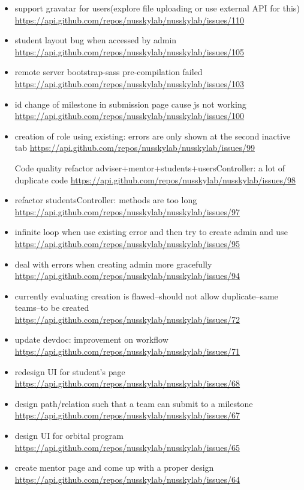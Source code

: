 {\begin{itemize}[noitemsep]
    \item support gravatar for users(explore file uploading or use external API for this) \url{https://api.github.com/repos/nusskylab/nusskylab/issues/110} 
    \item student layout bug when accessed by admin \url{https://api.github.com/repos/nusskylab/nusskylab/issues/105} 
    \item remote server bootstrap-sass pre-compilation failed \url{https://api.github.com/repos/nusskylab/nusskylab/issues/103} 
    \item id change of milestone in submission page cause js not working \url{https://api.github.com/repos/nusskylab/nusskylab/issues/100} 
    \item creation of role using existing: errors are only shown at the second inactive tab \url{https://api.github.com/repos/nusskylab/nusskylab/issues/99} 
    \item [Code quality]refactor adviser+mentor+students+usersController: a lot of duplicate code \url{https://api.github.com/repos/nusskylab/nusskylab/issues/98} 
    \item refactor studentsController: methods are too long \url{https://api.github.com/repos/nusskylab/nusskylab/issues/97} 
    \item infinite loop when use existing error and then try to create admin and use \url{https://api.github.com/repos/nusskylab/nusskylab/issues/95} 
    \item deal with errors when creating admin more gracefully \url{https://api.github.com/repos/nusskylab/nusskylab/issues/94} 
    \item currently evaluating creation is flawed--should not allow duplicate--same teams--to be created \url{https://api.github.com/repos/nusskylab/nusskylab/issues/72} 
    \item update devdoc: improvement on workflow \url{https://api.github.com/repos/nusskylab/nusskylab/issues/71} 
    \item redesign UI for student's page \url{https://api.github.com/repos/nusskylab/nusskylab/issues/68} 
    \item design path/relation such that a team can submit to a milestone \url{https://api.github.com/repos/nusskylab/nusskylab/issues/67} 
    \item design UI for orbital program \url{https://api.github.com/repos/nusskylab/nusskylab/issues/65} 
    \item create mentor page and come up with a proper design \url{https://api.github.com/repos/nusskylab/nusskylab/issues/64} 

\end{itemize}}

